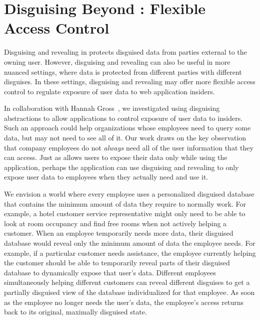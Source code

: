 \section{Disguising Beyond \sys: Flexible Access Control}
\vspace{-3pt}
Disguising and revealing in \sys protects disguised data from parties external
to the owning user. However, disguising and revealing can also be useful in more
nuanced settings, where data is protected from different parties with different
disguises.
%
In these settings, disguising and revealing may offer more flexible access
control to regulate exposure of user data to web application insiders.
%

%
In collaboration with Hannah Gross~\cite{funhouse}, we investigated using
disguising abstractions to allow applications to control exposure of user data
to insiders. Such an approach could help organizations whose employees
need to query some data, but may not need to see all of it.
%
Our work draws on the key observation that company employees do not
\emph{always} need all of the user information that they can access.
%
Just as \sys allows users to expose their data only while using the application,
perhaps the application can use disguising and revealing to only expose user
data to employees when they actually need and use it.
%

%
We envision a world where every employee uses a personalized disguised database
that contains the minimum amount of data they require to normally work. For
example, a hotel customer service representative might only need to be able to
look at room occupancy and find free rooms when not actively helping a customer.
%
%
When an employee temporarily needs more data, their disguised database would
reveal only the minimum amount of data the employee needs. For example, if a
particular customer needs assistance, the employee currently helping the
customer should be able to temporarily reveal parts of their disguised database
to dynamically expose that user's data.
%
Different employees simultaneously helping different customers can reveal
different disguises to get a partially disguised view of the database
individualized for that employee.
%
As soon as the employee no longer needs the user's data, the employee’s access
returns back to its original, maximally disguised state.
%

